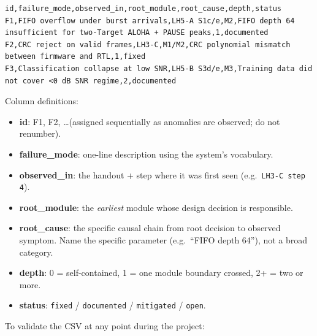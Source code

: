 \documentclass[11pt,letterpaper]{article}
\begin{document}
\begin{lstlisting}[caption={\texttt{failure\_modes.csv} --- append one row per observed anomaly.}]
id,failure_mode,observed_in,root_module,root_cause,depth,status
F1,FIFO overflow under burst arrivals,LH5-A S1c/e,M2,FIFO depth 64 insufficient for two-Target ALOHA + PAUSE peaks,1,documented
F2,CRC reject on valid frames,LH3-C,M1/M2,CRC polynomial mismatch between firmware and RTL,1,fixed
F3,Classification collapse at low SNR,LH5-B S3d/e,M3,Training data did not cover <0 dB SNR regime,2,documented
\end{lstlisting}

Column definitions:
\begin{itemize}[leftmargin=2em]
	\item \textbf{id}: F1, F2, \ldots (assigned sequentially as anomalies are observed; do not renumber).
	\item \textbf{failure\_mode}: one-line description using the system's vocabulary.
	\item \textbf{observed\_in}: the handout + step where it was first seen (e.g.\ \texttt{LH3-C step 4}).
	\item \textbf{root\_module}: the \emph{earliest} module whose design decision is responsible.
	\item \textbf{root\_cause}: the specific causal chain from root decision to observed symptom. Name the specific parameter (e.g.\ ``FIFO depth 64''), not a broad category.
	\item \textbf{depth}: 0 = self-contained, 1 = one module boundary crossed, 2+ = two or more.
	\item \textbf{status}: \texttt{fixed} / \texttt{documented} / \texttt{mitigated} / \texttt{open}.
\end{itemize}

To validate the CSV at any point during the project:
\end{document}

